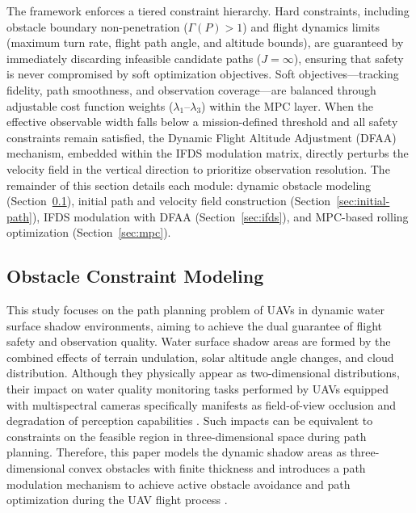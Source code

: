 \documentclass[final,3p,times,numbers]{elsarticle}
\begin{document}
The framework enforces a tiered constraint hierarchy. Hard constraints, including obstacle boundary non-penetration ($\Gamma(P) > 1$) and flight dynamics limits (maximum turn rate, flight path angle, and altitude bounds), are guaranteed by immediately discarding infeasible candidate paths ($J = \infty$), ensuring that safety is never compromised by soft optimization objectives. Soft objectives---tracking fidelity, path smoothness, and observation coverage---are balanced through adjustable cost function weights ($\lambda_1$--$\lambda_3$) within the MPC layer. When the effective observable width falls below a mission-defined threshold and all safety constraints remain satisfied, the Dynamic Flight Altitude Adjustment (DFAA) mechanism, embedded within the IFDS modulation matrix, directly perturbs the velocity field in the vertical direction to prioritize observation resolution. The remainder of this section details each module: dynamic obstacle modeling (Section~\ref{sec:obstacle-modeling}), initial path and velocity field construction (Section~\ref{sec:initial-path}), IFDS modulation with DFAA (Section~\ref{sec:ifds}), and MPC-based rolling optimization (Section~\ref{sec:mpc}).

\subsection{Obstacle Constraint Modeling}
\label{sec:obstacle-modeling}
This study focuses on the path planning problem of UAVs in dynamic water surface shadow environments, aiming to achieve the dual guarantee of flight safety and observation quality. Water surface shadow areas are formed by the combined effects of terrain undulation, solar altitude angle changes, and cloud distribution. Although they physically appear as two-dimensional distributions, their impact on water quality monitoring tasks performed by UAVs equipped with multispectral cameras specifically manifests as field-of-view occlusion and degradation of perception capabilities \cite{ref:14}. Such impacts can be equivalent to constraints on the feasible region in three-dimensional space during path planning. Therefore, this paper models the dynamic shadow areas as three-dimensional convex obstacles with finite thickness \cite{ref:66} and introduces a path modulation mechanism to achieve active obstacle avoidance and path optimization during the UAV flight process \cite{ref:67}.
\end{document}
